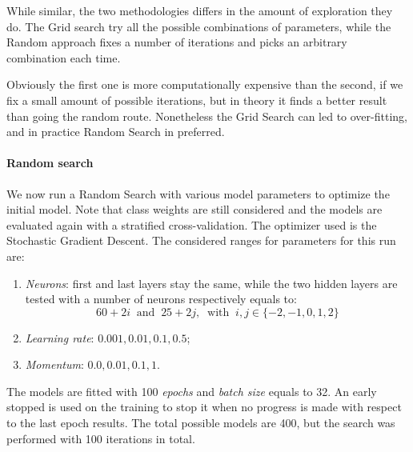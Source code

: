 While similar, the two methodologies differs in the amount of exploration they do.
The Grid search try all the possible combinations of parameters, while the 
Random approach fixes a number of iterations and picks an arbitrary combination each time. 

Obviously the first one is more computationally expensive than the second, if 
we fix a small amount of possible iterations, but in theory it finds a better result
than going the random route. 
Nonetheless the Grid Search can led to over-fitting, and in practice Random 
Search in preferred.

\paragraph{Random search}
We now run a Random Search with various model parameters 
to optimize the initial model.
Note that class weights are still considered and the models are evaluated
again with a stratified cross-validation.
The optimizer used is the Stochastic Gradient Descent.
The considered ranges for parameters for this run are: 
\begin{enumerate}
    \item \emph{Neurons}: first and last layers stay the same, while 
    the two hidden layers are tested with a number of neurons respectively 
    equals to: 
    $$60 + 2i\;\;\text{and}\;\;25 + 2j,\;\;\text{with}\;\; i, j \in \{-2,-1,0,1,2\}$$
    \item \emph{Learning rate}: $0.001, 0.01, 0.1, 0.5$;
    \item \emph{Momentum}: $0.0, 0.01, 0.1, 1$.
\end{enumerate}

The models are fitted with 100 \emph{epochs} and \emph{batch size} equals to 32.
An early stopped is used on the training to stop it when no progress is made with 
respect to the last epoch results.
The total possible models are 400, but the search was performed with 100 iterations
in total.

